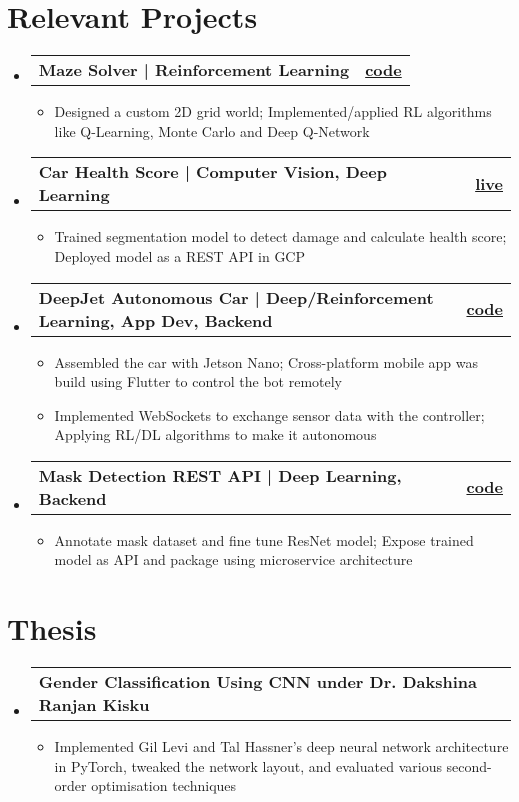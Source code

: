 \documentclass[letterpaper,10pt]{article}
\makeatletter
\newcommand{\resumeItemClean}[1]{
    \item\small{
        {#1 \vspace{-2pt}}
    }
}
\newcommand{\projectheading}[3]{
    \vspace{-1pt}\item
        \begin{tabular*}{0.97\textwidth}{l@{\extracolsep{\fill}}r}
            \textbf{#1} & \textbf{#2} #3\\
    \end{tabular*}\vspace{-5pt}
}
\newcommand{\resumeSubHeadingListStart}{\begin{itemize}[leftmargin=*]}
\newcommand{\resumeSubHeadingListEnd}{\end{itemize}}
\newcommand{\resumeItemListStart}{\begin{itemize}}
\newcommand{\resumeItemListEnd}{\end{itemize}\vspace{-5pt}}
\makeatother
\begin{document}
\section{Relevant Projects}
    \resumeSubHeadingListStart
        \projectheading{Maze Solver | Reinforcement Learning}{\href{https://github.com/vinaykudari/maze-solver}{code}}{}
            \resumeItemListStart
                \resumeItemClean
                    {Designed a custom 2D grid world; Implemented/applied RL algorithms like Q-Learning, Monte Carlo and Deep Q-Network}
            \resumeItemListEnd
        \projectheading{Car Health Score | Computer Vision, Deep Learning}{\href{https://finddentsonmycar.tech/}{live}}{}
            \resumeItemListStart
                \resumeItemClean
                    {Trained segmentation model to detect damage and calculate health score; Deployed model as a REST API in GCP}
            \resumeItemListEnd
        \projectheading{DeepJet Autonomous Car | Deep/Reinforcement Learning, App Dev, Backend}{\href{https://github.com/vinaykudari/eureka-bot}{code}}{}
            \resumeItemListStart
                \resumeItemClean
                    {Assembled the car with Jetson Nano; Cross-platform mobile app was build using Flutter to control the bot remotely}
                \resumeItemClean
                    {Implemented WebSockets to exchange sensor data with the controller; Applying RL/DL algorithms to make it autonomous}
            \resumeItemListEnd
        \projectheading{Mask Detection REST API | Deep Learning, Backend}{\href{https://github.com/vinaykudari/mask-detection-api}{code}}{}
            \resumeItemListStart
                \resumeItemClean
                    {Annotate mask dataset and fine tune ResNet model; Expose trained model as API and package using microservice architecture}
            \resumeItemListEnd
    \resumeSubHeadingListEnd
    
\section{Thesis}
\resumeSubHeadingListStart
\projectheading{Gender Classification Using CNN under Dr. Dakshina Ranjan Kisku}{}{}{}
            \resumeItemListStart
                \resumeItemClean
                    {Implemented Gil Levi and Tal Hassner's deep neural network architecture in PyTorch, tweaked the network layout, and evaluated various second-order optimisation techniques}
            \resumeItemListEnd
  \resumeSubHeadingListEnd
    
\end{document}
